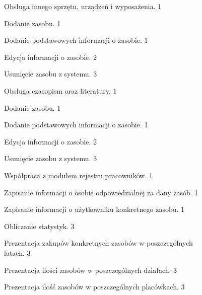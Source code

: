 \begin{myEnumerate}
\begin{myEnumerate}
\begin{myEnumerate}
	\item\label{f17} Obsługa innego sprzętu, urządzeń i wyposażenia.
	\hfill 1
	\begin{myEnumerate}
		\item\label{f18} Dodanie zasobu.
		\hfill 1
		\begin{myEnumerate}
			\item\label{f19} Dodanie podstawowych informacji o zasobie.
			\hfill 1
		\end{myEnumerate}
		\item\label{f20} Edycja informacji o zasobie.
		\hfill 2
		\item\label{f21} Usunięcie zasobu z systemu.
		\hfill 3
	\end{myEnumerate}

	\item\label{f22} Obsługa czasopism oraz literatury.
	\hfill 1
	\begin{myEnumerate}
		\item\label{f23} Dodanie zasobu.
		\hfill 1
		\begin{myEnumerate}
			\item\label{f24} Dodanie podstawowych informacji o zasobie.
			\hfill 1
		\end{myEnumerate}
		\item\label{f25} Edycja informacji o zasobie.
		\hfill 2
		\item\label{f26} Usunięcie zasobu z systemu.
		\hfill 3
	\end{myEnumerate}

	\end{myEnumerate}

	\item\label{f27} Współpraca z modułem rejestru pracowników.
	\hfill 1
	\begin{myEnumerate}
	\item\label{f28} Zapisanie informacji o osobie odpowiedzialnej za dany zasób.
	\hfill 1
	\item\label{f29} Zapisanie informacji o użytkowniku konkretnego
	 zasobu.
	 \hfill 1
	\end{myEnumerate}

	\item\label{f30} Obliczanie statystyk.
	\hfill 3
	\begin{myEnumerate}
	\item\label{f31} Prezentacja zakupów konkretnych zasobów w poszczególnych \\ latach.
	\hfill 3
	\item\label{f32} Prezentacja ilości zasobów w poszczególnych działach.
	\hfill 3
	\item\label{f33} Prezentacja ilość zasobów w poszczególnych placówkach.
	\hfill 3
	\end{myEnumerate}
	\end{myEnumerate}



\end{myEnumerate}
